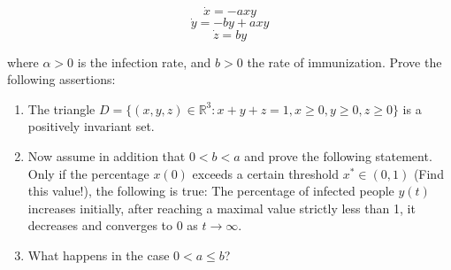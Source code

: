 \documentclass[12pt,letterpaper,reqno]{amsart}
\newcommand{\R}{\mathbb R}
\begin{document}
\begin{enumerate}
$$\dot{x} = -axy$$
$$\dot{y} = -by + axy$$
$$\dot{z} = by$$

where $\alpha > 0$ is the infection rate, and $b > 0$ the rate of immunization. Prove the following assertions:
\begin{enumerate}
    \item The triangle $D = \{(x,y,z) \in \R^3 : x + y + z = 1, x \geq 0, y \geq 0, z \geq 0\}$ is a positively invariant set.
    \item Now assume in addition that $0 < b < a$ and prove the following statement. Only if the percentage $x(0)$ exceeds a certain threshold $x^* \in (0,1)$ (Find this value!), the following is true: The percentage of infected people $y(t)$ increases initially, after reaching a maximal value strictly less than 1, it decreases and converges to 0 as $t \rightarrow \infty$.
    \item What happens in the case $0 < a \leq b$?
\end{enumerate}

\end{enumerate}
\end{document}
